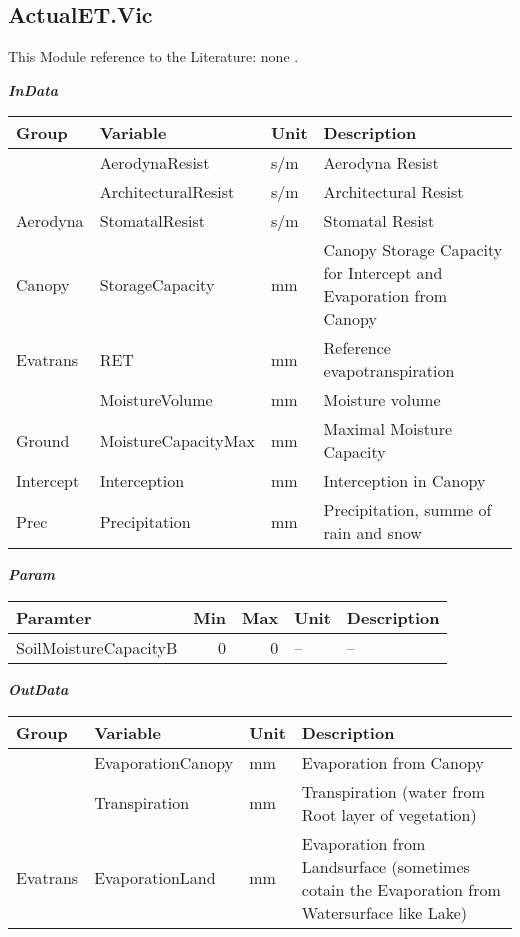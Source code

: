 \documentclass[
]{book}
\begin{document}
\hypertarget{actualet.vic}{%
\subsection{ActualET.Vic}\label{actualet.vic}}

This Module reference to the Literature: none \citep{none}.

\textbf{\emph{InData}}

\begin{table}[!h]
\centering
\begin{tabular}{l|l|l|l}
\hline
Group & Variable & Unit & Description\\
\hline
 & AerodynaResist & s/m & Aerodyna Resist\\
\cline{2-4}
 & ArchitecturalResist & s/m & Architectural Resist\\
\cline{2-4}
\multirow{-3}{*}{\raggedright\arraybackslash Aerodyna} & StomatalResist & s/m & Stomatal Resist\\
\cline{1-4}
Canopy & StorageCapacity & mm & Canopy Storage Capacity for Intercept and Evaporation from Canopy\\
\cline{1-4}
Evatrans & RET & mm & Reference evapotranspiration\\
\cline{1-4}
 & MoistureVolume & mm & Moisture volume\\
\cline{2-4}
\multirow{-2}{*}{\raggedright\arraybackslash Ground} & MoistureCapacityMax & mm & Maximal Moisture Capacity\\
\cline{1-4}
Intercept & Interception & mm & Interception in Canopy\\
\cline{1-4}
Prec & Precipitation & mm & Precipitation, summe of rain and snow\\
\hline
\end{tabular}
\end{table}

\textbf{\emph{Param}}

\begin{table}[!h]
\centering
\begin{tabular}{l|r|r|l|l}
\hline
Paramter & Min & Max & Unit & Description\\
\hline
SoilMoistureCapacityB & 0 & 0 & -- & --\\
\hline
\end{tabular}
\end{table}

\textbf{\emph{OutData}}

\begin{table}[!h]
\centering
\begin{tabular}{l|l|l|l}
\hline
Group & Variable & Unit & Description\\
\hline
 & EvaporationCanopy & mm & Evaporation from Canopy\\
\cline{2-4}
 & Transpiration & mm & Transpiration (water from Root layer of vegetation)\\
\cline{2-4}
\multirow{-3}{*}{\raggedright\arraybackslash Evatrans} & EvaporationLand & mm & Evaporation from Landsurface (sometimes cotain the Evaporation from Watersurface like Lake)\\
\hline
\end{tabular}
\end{table}
\end{document}
